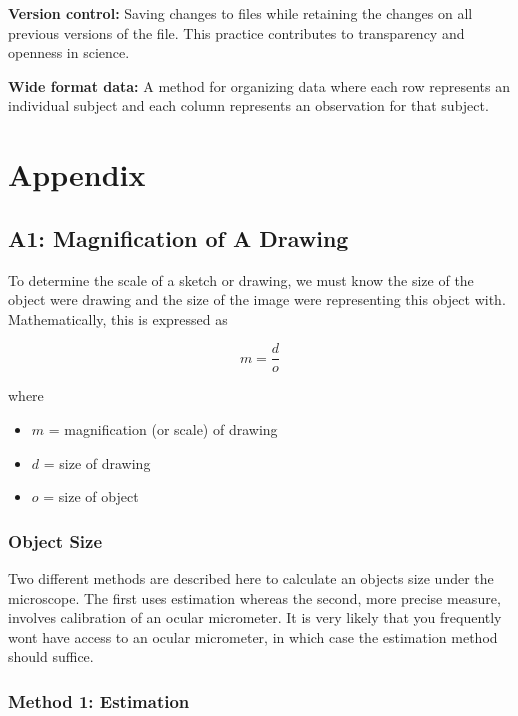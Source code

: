 \documentclass[
]{book}
\providecommand{\tightlist}{%
  \setlength{\itemsep}{0pt}\setlength{\parskip}{0pt}}
\begin{document}
\textbf{Version control:} Saving changes to files while retaining the changes on all previous versions of the file. This practice contributes to transparency and openness in science.

\textbf{Wide format data:} A method for organizing data where each row represents an individual subject and each column represents an observation for that subject.

\part*{Appendix}\label{part-appendix}

\chapter*{A1: Magnification of A Drawing}\label{a1-magnification-of-a-drawing}

To determine the scale of a sketch or drawing, we must know the size of the object we\textquotesingle re drawing and the size of the image we\textquotesingle re representing this object with. Mathematically, this is expressed as

\[m = \frac{d}{o}\]

where

\begin{itemize}
\tightlist
\item
  \(m\) = magnification (or scale) of drawing
\item
  \(d\) = size of drawing
\item
  \(o\) = size of object
\end{itemize}

\section{Object Size}\label{object-size}

Two different methods are described here to calculate an object\textquotesingle s size under the microscope. The first uses estimation whereas the second, more precise measure, involves calibration of an ocular micrometer. It is very likely that you frequently won\textquotesingle t have access to an ocular micrometer, in which case the estimation method should suffice.

\section{Method 1: Estimation}\label{method-1-estimation}
\end{document}
